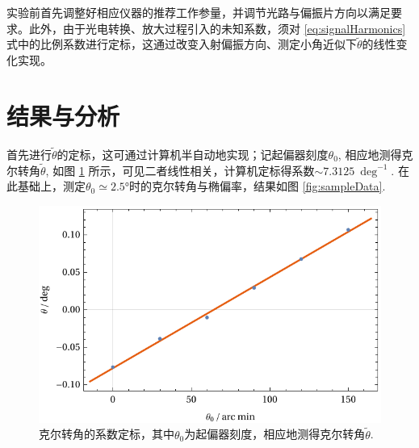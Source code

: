 \documentclass[aps,pre,12pt,preprint,%
	onecolumn,showpacs,showkeys,nofootinbib]{revtex4-1}
\begin{document}
	实验前首先调整好相应仪器的推荐工作参量，并调节光路与偏振片方向以满足要求。此外，由于光电转换、放大过程引入的未知系数，须对 \eqref{eq:signalHarmonics} 式中的比例系数进行定标，这通过改变入射偏振方向、测定小角近似下$\tilde{\theta}$的线性变化实现。
\section{结果与分析}
%
%
	首先进行$\tilde{\theta}$的定标，这可通过计算机半自动地实现；记起偏器刻度$\theta_0$, 相应地测得克尔转角$\tilde{\theta}$, 如图 \ref{fig:calibration} 所示，可见二者线性相关，计算机定标得系数$\sim \SI{7.3125}{\deg^{-1}}$. 在此基础上，测定$\theta_0 \simeq \ang{2.5}$时的克尔转角与椭偏率，结果如图 \ref{fig:sampleData}. 
\clearpage
	
	\begin{figure}[!ht]
		\centering\small
		\includegraphics[width=.6\linewidth]{img/calibrationPlot.pdf}
		\hspace{2em}
		\caption[克尔转角的系数定标]{克尔转角的系数定标，其中$\theta_0$为起偏器刻度，相应地测得克尔转角$\tilde{\theta}$. }
		\label{fig:calibration}
	\end{figure}
	
\end{document}
